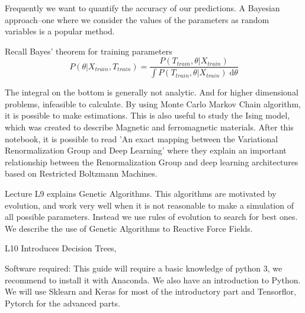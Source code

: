 \documentclass[11pt,letterpaper]{report}
\begin{document}
	

Frequently we want to quantify the accuracy of our predictions. A Bayesian approach--one where we consider the values of the parameters as random variables is a popular method.

Recall Bayes' theorem for training parameters
\begin{equation}
P(\theta|X_{train}, T_{train}) = \frac{P(T_{train}, \theta|X_{train})}{\int P(T_{train}, \theta|X_{train})\;\mathrm{d}\theta} 
\end{equation}

The integral on the bottom is generally not analytic. And for higher dimensional problems, infeasible to calculate. By using Monte Carlo Markov Chain algorithm, it is possible to make estimations.  This is also useful to study   the Ising model, which was created to describe Magnetic and ferromagnetic materials. 
After this notebook,  it is possible to read 'An exact mapping between the Variational Renormalization Group and Deep Learning' where they explain an important relationship between the Renormalization Group and deep learning architectures based on Restricted Boltzmann Machines.

Lecture L9 explains Genetic Algorithms. This algorithms are motivated by evolution, and work very well when it is not reasonable to make a simulation of all possible parameters. Instead we use rules of evolution to search for best ones. We describe the use of Genetic Algorithms to Reactive Force Fields. 	
		

		
L10 Introduces Decision Trees, 		
		
		
	Software required:
	This guide will require a basic knowledge of python 3, we recommend to install it with Anaconda. We also have an introduction to Python.
	 We will use Sklearn and Keras for most of the introductory part and Tensorflor, Pytorch for the advanced parts.
	
	
	
	
\end{document}
